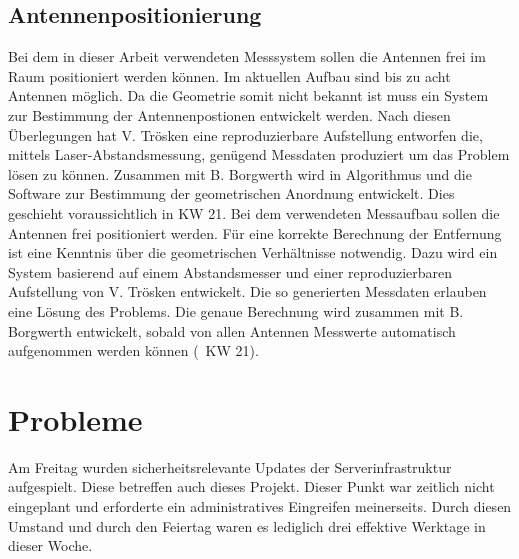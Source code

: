 \documentclass[a4paper,12pt,fleqn]{article}
\begin{document}
\subsection{Antennenpositionierung}
Bei dem in dieser Arbeit verwendeten Messsystem sollen die Antennen frei im Raum positioniert werden können. Im aktuellen Aufbau sind bis zu acht Antennen möglich. Da die Geometrie somit nicht bekannt ist muss ein System zur Bestimmung der Antennenpostionen entwickelt werden. Nach diesen Überlegungen hat V. Trösken eine reproduzierbare Aufstellung entworfen die, mittels Laser-Abstandsmessung, genügend Messdaten produziert um das Problem lösen zu können. Zusammen mit B. Borgwerth wird in Algorithmus und die Software zur Bestimmung der geometrischen Anordnung entwickelt. Dies geschieht voraussichtlich in KW 21.
Bei dem verwendeten Messaufbau sollen die Antennen frei positioniert werden. Für eine korrekte Berechnung der Entfernung ist eine Kenntnis über die geometrischen Verhältnisse notwendig. Dazu wird ein System basierend auf einem Abstandsmesser und einer reproduzierbaren Aufstellung von V. Trösken entwickelt. Die so generierten Messdaten erlauben eine Lösung des Problems. Die genaue Berechnung wird zusammen mit B. Borgwerth entwickelt, sobald von allen Antennen Messwerte automatisch aufgenommen werden können (~KW 21).

\section[Probleme]{Probleme}
Am Freitag wurden sicherheitsrelevante Updates der Serverinfrastruktur aufgespielt. Diese betreffen auch dieses Projekt. Dieser Punkt war zeitlich nicht eingeplant und erforderte ein administratives Eingreifen meinerseits. Durch diesen Umstand und durch den Feiertag waren es lediglich drei effektive Werktage in dieser Woche.



\newpage


\end{document}
